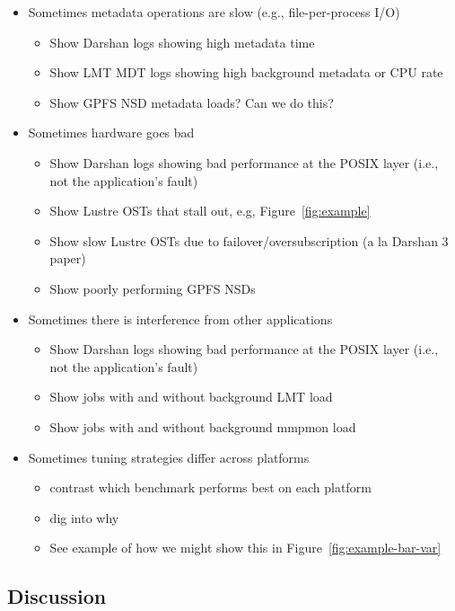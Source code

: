 \documentclass[conference,10pt,compsocconf]{IEEEtran}
\begin{document}
\begin{itemize}
\item Sometimes metadata operations are slow (e.g., file-per-process I/O)
    \begin{itemize}
    \item Show Darshan logs showing high metadata time
    \item Show LMT MDT logs showing high background metadata or CPU rate
    \item Show GPFS NSD metadata loads?  Can we do this?
    \end{itemize}
\item Sometimes hardware goes bad
    \begin{itemize}
    \item Show Darshan logs showing bad performance at the POSIX layer (i.e., not the
    application's fault)
    \item Show Lustre OSTs that stall out, e.g, Figure~\ref{fig:example}
    \item Show slow Lustre OSTs due to failover/oversubscription (a la Darshan 3 paper)
    \item Show poorly performing GPFS NSDs
    \end{itemize}
\item Sometimes there is interference from other applications
    \begin{itemize}
    \item Show Darshan logs showing bad performance at the POSIX layer (i.e., not the
    application's fault)
    \item Show jobs with and without background LMT load
    \item Show jobs with and without background mmpmon load
    \end{itemize}
\item Sometimes tuning strategies differ across platforms
    \begin{itemize}
    \item contrast which benchmark performs best on each platform
    \item dig into why
    \item See example of how we might show this in Figure~\ref{fig:example-bar-var}
    \end{itemize}
\end{itemize}

\subsection{Discussion}
\end{document}
